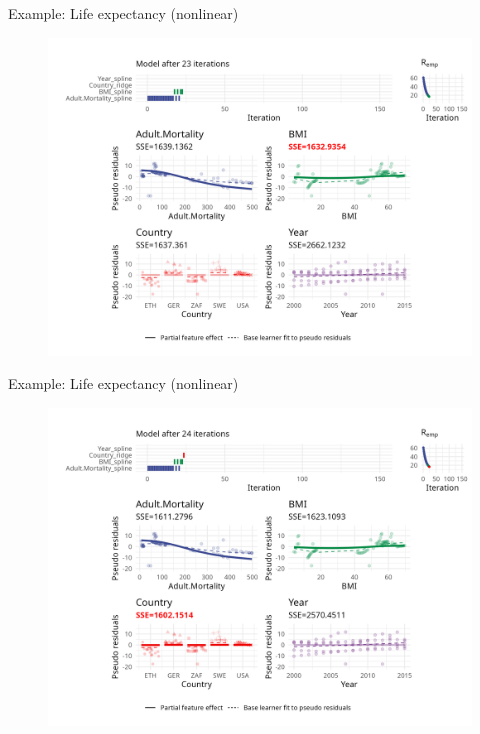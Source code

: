 \begin{frame}{Example: Life expectancy (nonlinear)}
	\begin{figure}
		\centering
		\includegraphics[width=\textwidth]{figure/cwb-anim-nl/fig-iter-0023.png}
	\end{figure}
	\addtocounter{framenumber}{-1}
\end{frame}


\begin{frame}{Example: Life expectancy (nonlinear)}
	\begin{figure}
		\centering
		\includegraphics[width=\textwidth]{figure/cwb-anim-nl/fig-iter-0024.png}
	\end{figure}
	\addtocounter{framenumber}{-1}
\end{frame}


